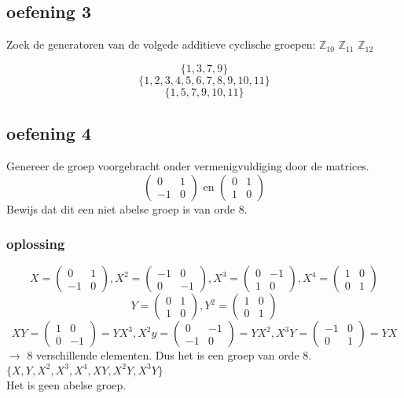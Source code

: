 \documentclass[main.tex]{subfiles}
\begin{document}
\subsection*{oefening 3}
Zoek de generatoren van de volgede additieve cyclische groepen: $\mathbb{Z}_{10}$ $\mathbb{Z}_{11}$ $\mathbb{Z}_{12}$

\[ \{ 1,3,7,9\} \]
\[ \{ 1,2,3,4,5,6,7,8,9,10,11 \} \]
\[ \{ 1,5,7,9,10,11 \} \]

\subsection*{oefening 4}

Genereer de groep voorgebracht onder vermenigvuldiging door de matrices.
\[ \left( \begin{array}{cc}
0 & 1 \\
-1 & 0
\end{array} \right)
\text{ en }
\left( \begin{array}{cc}
0 & 1 \\
1 & 0
\end{array} \right)
\]
Bewijs dat dit een niet abelse groep is van orde 8.
\subsubsection*{oplossing}
\[
X=
\begin{pmatrix}
0 &1\\
-1&0
\end{pmatrix}
, X^2=
\begin{pmatrix}
-1&0\\
0&-1
\end{pmatrix}
,X^3=
\begin{pmatrix}
0 & -1\\
1&0
\end{pmatrix}
,X^4=
\begin{pmatrix}
1 & 0\\
0 & 1
\end{pmatrix}
\]
\[
Y=
\begin{pmatrix}
0 & 1\\
1 & 0
\end{pmatrix}
,Y^2=
\begin{pmatrix}
1&0\\
0&1
\end{pmatrix}
\]
\[
XY=
\begin{pmatrix}
1 &0\\
0 &-1
\end{pmatrix}
=YX^3,X^2y=
\begin{pmatrix}
0 &- 1\\
-1 &0
\end{pmatrix}
=YX^2,X^3Y=
\begin{pmatrix}
-1 & 0\\
0&1
\end{pmatrix}
=YX
\]
$\rightarrow$ 8 verschillende elementen. Dus het is een groep van orde 8.
\\$\{X,Y,X^2,X^3,X^4,XY,X^2Y,X^3Y\}$
\\Het is geen abelse groep.
\end{document}
